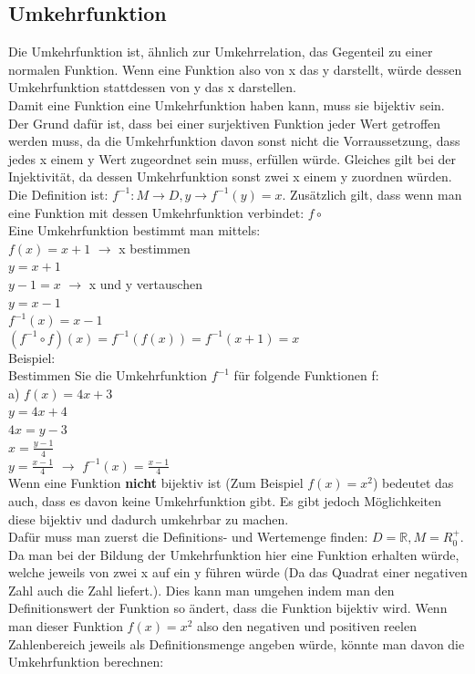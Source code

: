 \documentclass{article}
\newcommand{\R}{\mathbb{R}}
\begin{document}
	 \subsection{Umkehrfunktion}
	 Die Umkehrfunktion ist, ähnlich zur Umkehrrelation, das Gegenteil zu einer normalen Funktion. Wenn eine Funktion also von x das y darstellt, würde dessen Umkehrfunktion stattdessen von y das x darstellen. \\
	 Damit eine Funktion eine Umkehrfunktion haben kann, muss sie bijektiv sein. Der Grund dafür ist, dass bei einer surjektiven Funktion jeder Wert getroffen werden muss, da die Umkehrfunktion davon sonst nicht die Vorraussetzung, dass jedes x einem y Wert zugeordnet sein muss, erfüllen würde. Gleiches gilt bei der Injektivität, da dessen Umkehrfunktion sonst zwei x einem y zuordnen würden. \\
	 Die Definition ist: $f^{-1}:M \rightarrow D,y \rightarrow f^{-1}(y)=x$. Zusätzlich gilt, dass wenn man eine Funktion mit dessen Umkehrfunktion verbindet: $f\circ $ \\
	 Eine Umkehrfunktion bestimmt man mittels: \\
	 $f(x)=x+1$ $\to$ x bestimmen \\
	 $y=x+1$ \\
	 $y-1=x$ $\to$ x und y vertauschen \\
	 $y=x-1$ \\
	 $f^{-1}(x)=x-1$ \\
	 $(f^{-1}\circ f)(x)=f^{-1}(f(x))=f^{-1}(x+1)=x$ \\
	 Beispiel: \\
	 Bestimmen Sie die Umkehrfunktion $f^{-1}$ für folgende Funktionen f: \\
	 a) $f(x)=4x+3$ \\
	 $y=4x+4$ \\
	 $4x=y-3$ \\
	 $x=\frac{y-1}{4}$ \\
	 $y=\frac{x-1}{4}$ $\to$ $f^{-1}(x)=\frac{x-1}{4}$ \\
	Wenn eine Funktion \textbf{nicht} bijektiv ist (Zum Beispiel $f(x)=x^2$) bedeutet das auch, dass es davon keine Umkehrfunktion gibt. Es gibt jedoch Möglichkeiten diese bijektiv und dadurch umkehrbar zu machen. \\
	Dafür muss man zuerst die Definitions- und Wertemenge finden: $D=\R, M=R^+_0$. Da man bei der Bildung der Umkehrfunktion hier eine Funktion erhalten würde, welche jeweils von zwei x auf ein y führen würde (Da das Quadrat einer negativen Zahl auch die Zahl liefert.). Dies kann man umgehen indem man den Definitionswert der Funktion so ändert, dass die Funktion bijektiv wird. Wenn man dieser Funktion $f(x)=x^2$ also den negativen und positiven reelen Zahlenbereich jeweils als Definitionsmenge angeben würde, könnte man davon die Umkehrfunktion berechnen: \\
\end{document}
